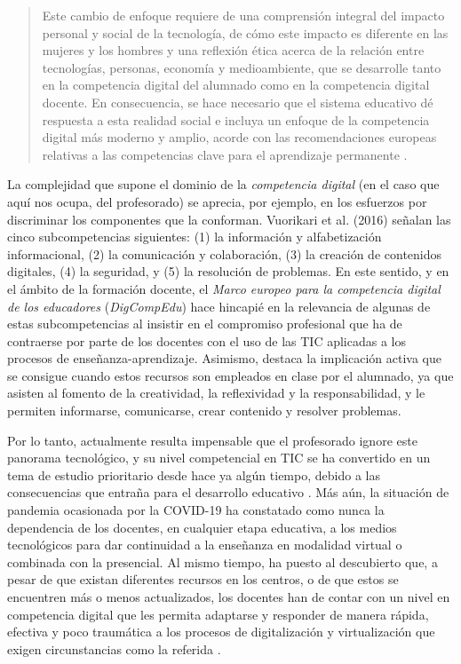 \documentclass[spanish]{textolivre}
\begin{document}
\begin{quote}
Este cambio de enfoque requiere de una comprensión integral del impacto personal y social de la tecnología, de cómo este impacto es diferente en las mujeres y los hombres y una reflexión ética acerca de la relación entre tecnologías, personas, economía y medioambiente, que se desarrolle tanto en la competencia digital del alumnado como en la competencia digital docente. En consecuencia, se hace necesario que el sistema educativo dé respuesta a esta realidad social e incluya un enfoque de la competencia digital más moderno y amplio, acorde con las recomendaciones europeas relativas a las competencias clave para el aprendizaje permanente \cite[p.~122871] {espana_ley_340}.
\end{quote}

La complejidad que supone el dominio de la \textit{competencia digital} (en el caso que aquí nos ocupa, del profesorado) se aprecia, por ejemplo, en los esfuerzos por discriminar los componentes que la conforman. Vuorikari et al. (2016) señalan las cinco subcompetencias siguientes: (1) la información y alfabetización informacional, (2) la comunicación y colaboración, (3) la creación de contenidos digitales, (4) la seguridad, y (5) la resolución de problemas. En este sentido, y en el ámbito de la formación docente, el \textit{Marco europeo para la competencia digital de los educadores} (\textit{DigCompEdu}) \cite{redecker_european_2017} hace hincapié en la relevancia de algunas de estas subcompetencias al insistir en el compromiso profesional que ha de contraerse por parte de los docentes con el uso de las TIC aplicadas a los procesos de enseñanza-aprendizaje. Asimismo, destaca la implicación activa que se consigue cuando estos recursos son empleados en clase por el alumnado, ya que asisten al fomento de la creatividad, la reflexividad y la responsabilidad, y le permiten informarse, comunicarse, crear contenido y resolver problemas.  

Por lo tanto, actualmente resulta impensable que el profesorado ignore este panorama tecnológico, y su nivel competencial en TIC se ha convertido en un tema de estudio prioritario desde hace ya algún tiempo, debido a las consecuencias que entraña para el desarrollo educativo \cite{suarez_rodriguez_competencias_2012, lazaro-cantabrana_assessing_2019, cabero-almenara_marco_2020, ortiz_colon_autopercepcion_2020}. Más aún, la situación de pandemia ocasionada por la COVID-19 ha constatado como nunca la dependencia de los docentes, en cualquier etapa educativa, a los medios tecnológicos para dar continuidad a la enseñanza en modalidad virtual o combinada con la presencial. Al mismo tiempo, ha puesto al descubierto que, a pesar de que existan diferentes recursos en los centros, o de que estos se encuentren más o menos actualizados, los docentes han de contar con un nivel en competencia digital que les permita adaptarse y responder de manera rápida, efectiva y poco traumática a los procesos de digitalización y virtualización que exigen circunstancias como la referida \cite{gomez_jimenez_competencia_2020, sa_covid-19_2020}.
\end{document}
